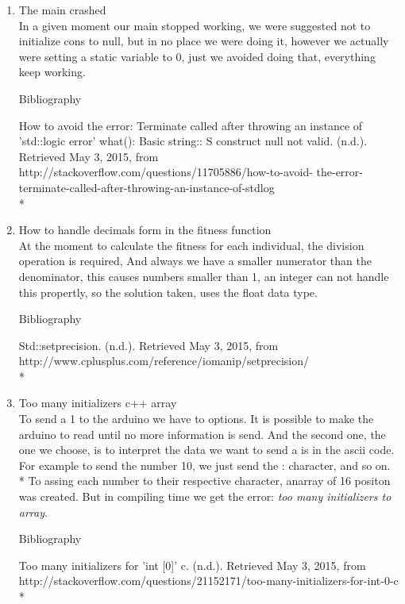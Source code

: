 \documentclass[twocolumn]{IEEEtran}
\begin{document}
\begin{enumerate}
    
	\item The main crashed\\
    In a given moment our main stopped working, we were suggested not to initialize cons 
    to null, but in no place we were doing it, however we actually were setting a static 
    variable to 0, just we avoided doing that, everything keep working.
    
    \begin{center}
    Bibliography
    \end{center}
    How to avoid the error: Terminate called after throwing an instance of 
    'std::logic error' what(): Basic string:: S construct null not valid. (n.d.). 
    Retrieved May 3, 2015, from http://stackoverflow.com/questions/11705886/how-to-avoid-
    the-error-terminate-called-after-throwing-an-instance-of-stdlog\\*


	\item How to handle decimals form in the fitness function\\
    	At the moment to calculate the fitness for each individual, the division 
        operation is required, And always we have a smaller numerator than the 
        denominator, this causes numbers smaller than 1, an integer can not handle this 
        propertly, so the solution taken, uses the float data type.
    \begin{center}
    Bibliography
    \end{center}
    Std::setprecision. (n.d.). Retrieved May 3, 2015, from 
    http://www.cplusplus.com/reference/iomanip/setprecision/\\*
	
    \item Too many initializers c++ array \\
    	To send a 1 to the arduino we have to options. It is possible to make the arduino 
        to read until no more information is send. And the second one, the one we choose, 
        is to interpret the data we want to send a is in the ascii code. For example to 
        send the number 10, we just send the : character, and so on.\\*
        To assing each number to their respective character, anarray of 16 positon was
        created. But in compiling time we get the error: \textit{too many initializers 
        to array}. 
        
    \begin{center}
    Bibliography
    \end{center}
    Too many initializers for 'int [0]' c. (n.d.). Retrieved May 3, 2015, from 
    http://stackoverflow.com/questions/21152171/too-many-initializers-for-int-0-c\\*


\end{enumerate}
\end{document}
